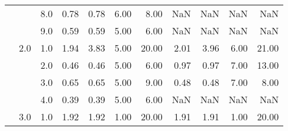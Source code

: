 \begin{tabular}{lllrrrrrrrr}
       &     & 8.0  &       0.78 &      0.78 & 6.00 &   8.00 &        NaN &       NaN &  NaN &    NaN \\
       &     & 9.0  &       0.59 &      0.59 & 5.00 &   6.00 &        NaN &       NaN &  NaN &    NaN \\
       & 2.0 & 1.0  &       1.94 &      3.83 & 5.00 &  20.00 &       2.01 &      3.96 & 6.00 &  21.00 \\
       &     & 2.0  &       0.46 &      0.46 & 5.00 &   6.00 &       0.97 &      0.97 & 7.00 &  13.00 \\
       &     & 3.0  &       0.65 &      0.65 & 5.00 &   9.00 &       0.48 &      0.48 & 7.00 &   8.00 \\
       &     & 4.0  &       0.39 &      0.39 & 5.00 &   6.00 &        NaN &       NaN &  NaN &    NaN \\
       & 3.0 & 1.0  &       1.92 &      1.92 & 1.00 &  20.00 &       1.91 &      1.91 & 1.00 &  20.00 \\
\bottomrule
\end{tabular}
